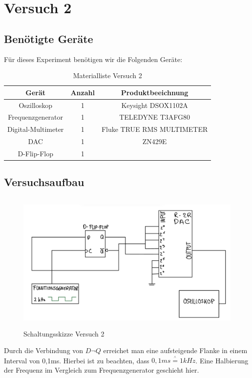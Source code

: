 \chapter{Versuch 2}

\section{Benötigte Geräte}

Für dieses Experiment benötigen wir die Folgenden Geräte:
\begin{table}[h]	
	\centering
	\begin{tabular}[h]{c|c|c}
		Gerät & Anzahl & Produktbeeichnung\\
		\hline
		Oszilloskop & 1  & Keysight DSOX1102A\\
		\hline
		Frequenzgenerator & 1 & TELEDYNE T3AFG80\\
		\hline 
		Digital-Multimeter & 1 & Fluke TRUE RMS MULTIMETER\\
		\hline
		DAC & 1 & ZN429E \\
		\hline
		D-Flip-Flop & 1 & 
	\end{tabular}
	\caption{Materialliste Versuch 2}
	\label{tab:Materialliste Versuch 2}
\end{table}

\section{Versuchsaufbau}
\label{sec:Versuchsaufbau}
\begin{figure}[H]
	\centering
	\includegraphics[height=7cm]{images/schaltungsskizze-versuch-zwei.jpeg} 
	\caption[]{Schaltungsskizze Versuch 2}
\end{figure}
Durch die Verbindung von $D\neg Q$ erreichet man eine aufsteigende Flanke
in einem Interval von 0,1ms. Hierbei ist zu beachten, dass $0,1ms \stackrel{^\wedge}{=} 1kHz$. 
Eine Halbierung der Frequenz im Vergleich zum Frequenzgenerator geschieht hier.

